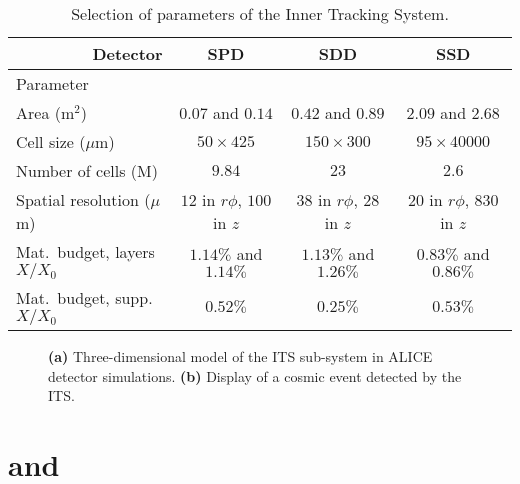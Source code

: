 \begin{table}[h!]
\centering
\caption{Selection of parameters of the Inner Tracking System. \cite{collaborationALICEExperimentCERN2008}}
\label{tab:alice:its}
\begin{tabular}{|cc|ccc|}
\hline
\multicolumn{2}{|r|}{\parbox[b][1.2em]{2em}{} Detector} & SPD & SDD & SSD \\ \hline
\multicolumn{5}{l}{\parbox[b][1.2em]{1em}{} Parameter} \\
\hline
\multicolumn{2}{|l|}{\parbox[b][1.1em]{1em}{}Area (m$^2$)} & $0.07$ and $0.14$ & $0.42$ and $0.89$ & $2.09$ and $2.68$\\ \hline
\multicolumn{2}{|l|}{\parbox[b][1.1em]{1em}{}Cell size ($\mu$m)} & $50\times 425$ & $150\times 300$ & $95\times 40000$\\ \hline
\multicolumn{2}{|l|}{\parbox[b][1.1em]{1em}{}Number of cells (M)} & $9.84$ & $23$ & $2.6$\\ \hline
\multicolumn{2}{|l|}{\parbox[b][1.1em]{1em}{}Spatial resolution ($\mu$m)} & $12$ in $r\phi$, $100$ in $z$ & $38$ in $r\phi$, $28$ in $z$ & $20$ in $r\phi$, $830$ in $z$\\ \hline
\multicolumn{2}{|l|}{\parbox[b][1.1em]{1em}{}Mat.\ budget, layers $X/X_0$} & $1.14\%$ and $1.14\%$ & $1.13\%$ and $1.26\%$ & $0.83\%$ and $0.86\%$\\ \hline
\multicolumn{2}{|l|}{\parbox[b][1.1em]{1em}{}Mat.\ budget, supp.\ $X/X_0$} & $0.52\%$ & $0.25\%$ & $0.53\%$\\ \hline
\end{tabular}
\end{table}

\begin{figure}[!h]
\caption{\textbf{(a)} Three-dimensional model of the ITS sub-system in ALICE detector simulations. \textbf{(b)} Display of a cosmic event detected by the ITS. \cite{alicecollaborationAlignmentALICEInner2010}}
\label{fig:alice:its}
\end{figure}

\section{\VOA and \VOC}

